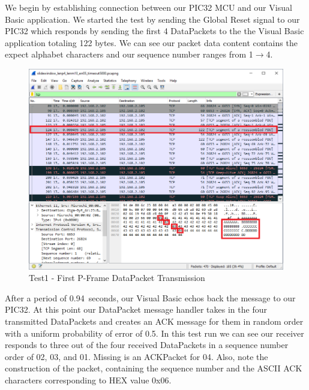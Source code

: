 \documentclass[12pt]{article}
\begin{document}
We begin by establishing connection between our PIC32 MCU and our Visual
Basic application. We started the test by sending the Global Reset signal
to our PIC32 which responds by sending the first 4 DataPackets to the
the Visual Basic application totaling 122 bytes. We can see our packet
data content contains the expect alphabet characters and our sequence number
ranges from 1$\rightarrow$4. 

\begin{figure}[H]
    \centering
    \includegraphics[width=5.5in]{slide_test1_00.png}
    \caption{Test1 - First P-Frame DataPacket Transmission}
    \label{fig:slidetest00}
\end{figure}

After a period of 0.94~seconds, our Visual Basic echos back the message to 
our PIC32. At this point our DataPacket message handler takes in the four
transmitted DataPackets and creates an ACK message for them in random order
with a uniform probability of error of 0.5. In this test run we can see
our receiver responds to three out of the four received DataPackets in a 
sequence number order of 02, 03, and 01. Missing is an ACKPacket for 04. 
Also, note the construction of the packet, containing the sequence number and
the ASCII ACK characters corresponding to HEX value 0x06.
\end{document}
